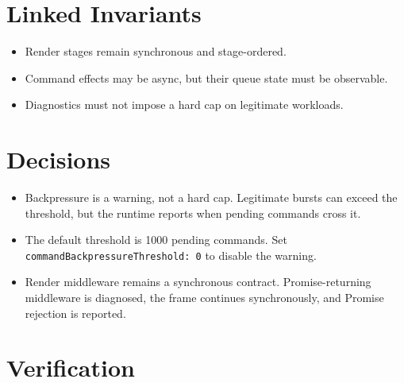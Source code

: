 \section{Linked Invariants}\label{record-166-linked-invariants}

\begin{itemize}
\tightlist
\item
  Render stages remain synchronous and stage-ordered.
\item
  Command effects may be async, but their queue state must be observable.
\item
  Diagnostics must not impose a hard cap on legitimate workloads.
\end{itemize}

\section{Decisions}\label{record-166-decisions}

\begin{itemize}
\tightlist
\item
  Backpressure is a warning, not a hard cap. Legitimate bursts can exceed the threshold, but the runtime reports when pending commands cross it.
\item
  The default threshold is 1000 pending commands. Set \texttt{c\allowbreak{}o\allowbreak{}m\allowbreak{}m\allowbreak{}a\allowbreak{}n\allowbreak{}d\allowbreak{}B\allowbreak{}a\allowbreak{}c\allowbreak{}k\allowbreak{}p\allowbreak{}r\allowbreak{}e\allowbreak{}s\allowbreak{}s\allowbreak{}u\allowbreak{}r\allowbreak{}e\allowbreak{}T\allowbreak{}h\allowbreak{}r\allowbreak{}e\allowbreak{}s\allowbreak{}h\allowbreak{}o\allowbreak{}l\allowbreak{}d\allowbreak{}:\allowbreak{} \allowbreak{}0} to disable the warning.
\item
  Render middleware remains a synchronous contract. Promise-returning middleware is diagnosed, the frame continues synchronously, and Promise rejection is reported.
\end{itemize}

\section{Verification}\label{record-166-verification}

